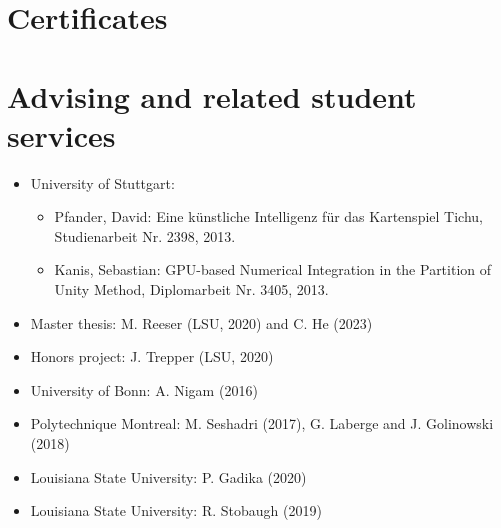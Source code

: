\documentclass[11pt,a4paper,sans]{moderncv}
\begin{document}
\section{Certificates}

\section{Advising and related student services}
\begin{itemize}[leftmargin=4cm]
\item University of Stuttgart:
\begin{itemize}
\item Pfander, David: Eine künstliche Intelligenz für das Kartenspiel Tichu, Studienarbeit Nr. 2398, 2013.
\item Kanis, Sebastian: GPU-based Numerical Integration in the Partition of Unity Method, Diplomarbeit Nr. 3405, 2013.
\end{itemize}
\end{itemize}

\begin{itemize}[leftmargin=4cm]
\item Master thesis: M. Reeser (LSU, 2020) and C. He (2023)
\item Honors project: J. Trepper (LSU, 2020)
\end{itemize}

\begin{itemize}[leftmargin=4cm]
\item University of Bonn: A. Nigam (2016)
\item Polytechnique Montreal:  M. Seshadri (2017), G. Laberge and J. Golinowski (2018)
\item Louisiana State University: P. Gadika (2020)
\end{itemize}

\begin{itemize}[leftmargin=4cm]
\item Louisiana State University: R. Stobaugh (2019)
\end{itemize}
\end{document}
